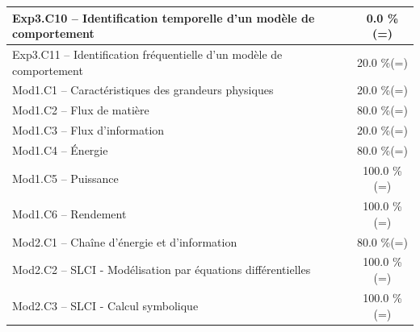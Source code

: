 \begin{center}
\begin{tabular}{|p{.7\linewidth}|c|}
Exp3.C10 -- Identification temporelle d’un modèle de comportement&0.0 \%(=)\\ \hline 
Exp3.C11 -- Identification fréquentielle d’un modèle de comportement&20.0 \%(=)\\ \hline 
Mod1.C1 -- Caractéristiques des grandeurs physiques&20.0 \%(=)\\ \hline 
Mod1.C2 -- Flux de matière&80.0 \%(=)\\ \hline 
Mod1.C3 -- Flux d’information&20.0 \%(=)\\ \hline 
Mod1.C4 -- Énergie&80.0 \%(=)\\ \hline 
Mod1.C5 -- Puissance&100.0 \%(=)\\ \hline 
Mod1.C6 -- Rendement&100.0 \%(=)\\ \hline 
Mod2.C1 -- Chaîne d’énergie et d'information&80.0 \%(=)\\ \hline 
Mod2.C2 -- SLCI - Modélisation par équations différentielles&100.0 \%(=)\\ \hline 
Mod2.C3 -- SLCI - Calcul symbolique&100.0 \%(=)\\ \hline 
\end{tabular} 
\end{center} 
\normalsize 
 
